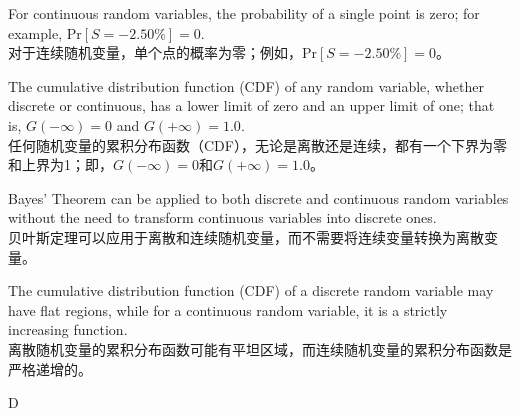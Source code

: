 \documentclass{article}
\begin{document}
    \begin{choices}
        \item For continuous random variables, the probability of a single point is zero; for example, \(\text{Pr}[S = - 2.50\%]=0\).\\
        对于连续随机变量，单个点的概率为零；例如，\(\text{Pr}[S = - 2.50\%]=0\)。
        \item The cumulative distribution function (CDF) of any random variable, whether discrete or continuous, has a lower limit of zero and an upper limit of one; that is, \(G(-\infty)=0\) and \(G(+\infty)=1.0\).\\
        任何随机变量的累积分布函数（CDF），无论是离散还是连续，都有一个下界为零和上界为1；即，\(G(-\infty)=0\)和\(G(+\infty)=1.0\)。
        \item Bayes' Theorem can be applied to both discrete and continuous random variables without the need to transform continuous variables into discrete ones.\\
        贝叶斯定理可以应用于离散和连续随机变量，而不需要将连续变量转换为离散变量。
        \item The cumulative distribution function (CDF) of a discrete random variable may have flat regions, while for a continuous random variable, it is a strictly increasing function.\\
        离散随机变量的累积分布函数可能有平坦区域，而连续随机变量的累积分布函数是严格递增的。
    \end{choices}
    
    \begin{correctanswer}
        D
    \end{correctanswer}
    
\end{document}
